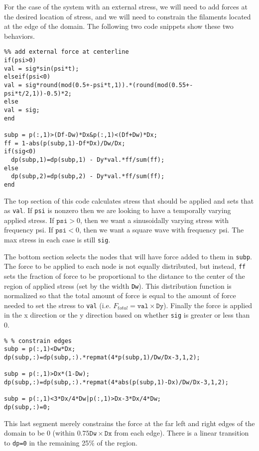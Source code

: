For the case of the system with an external stress, we will need to add forces at the desired location of stress, and we will need to constrain the filaments located at the edge of the domain.  The following two code snippets show these two behaviors.


\begin{verbatim}
%% add external force at centerline
if(psi>0)
val = sig*sin(psi*t);
elseif(psi<0)
val = sig*round(mod(0.5+-psi*t,1)).*(round(mod(0.55+-psi*t/2,1))-0.5)*2;
else
val = sig;
end

subp = p(:,1)>(Df-Dw)*Dx&p(:,1)<(Df+Dw)*Dx;
ff = 1-abs(p(subp,1)-Df*Dx)/Dw/Dx;
if(sig<0)
  dp(subp,1)=dp(subp,1) - Dy*val.*ff/sum(ff);
else
  dp(subp,2)=dp(subp,2) - Dy*val.*ff/sum(ff);
end
\end{verbatim}

The top section of this code calculates stress that should be applied and sets that as \texttt{val}.  If \texttt{psi} is nonzero then we are looking to have a temporally varying applied stress.  If $\texttt{psi}>0$, then we want a sinusoidally varying stress with frequency psi.  If $\texttt{psi}<0$, then we want a square wave with frequency psi.  The max stress in each case is still \texttt{sig}.

The bottom section selects the nodes that will have force added to them in \texttt{subp}.  The force to be applied to each node is not equally distributed, but instead, \texttt{ff} sets the fraction of force to be proportional to the distance to the center of the region of applied stress (set by the width \texttt{Dw}).  This distribution function is normalized so that the total amount of force is equal to the amount of force needed to set the stress to \texttt{val} (i.e. $F_{total} = \texttt{val} \times \texttt{Dy}$).  Finally the force is applied in the x direction or the y direction based on whether \texttt{sig} is greater or less than 0.


\begin{verbatim}
% % constrain edges
subp = p(:,1)<Dw*Dx;
dp(subp,:)=dp(subp,:).*repmat(4*p(subp,1)/Dw/Dx-3,1,2);

subp = p(:,1)>Dx*(1-Dw);
dp(subp,:)=dp(subp,:).*repmat(4*abs(p(subp,1)-Dx)/Dw/Dx-3,1,2);

subp = p(:,1)<3*Dx/4*Dw|p(:,1)>Dx-3*Dx/4*Dw;
dp(subp,:)=0;
\end{verbatim}

This last segment merely constrains the force at the far left and right edges of the domain to be 0 (within $0.75 \texttt{Dw}\times\texttt{Dx}$ from each edge).  There is a linear transition to \texttt{dp=0} in the remaining 25\% of the region.

